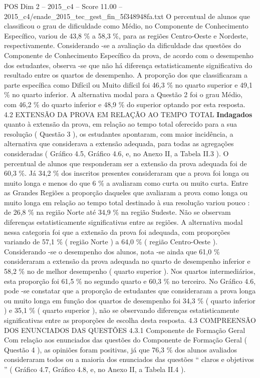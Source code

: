 \begin{textsample}{POS Dim 2 – 2015\_c4 – Score 11.00 – 2015\_c4/enade\_2015\_tec\_gest\_fin\_5f348948fa.txt}
O percentual de alunos que classificou o grau de dificuldade como Médio, no Componente de Conhecimento Específico, variou de 43,8 \% a 58,3 \%, para as regiões Centro-Oeste e Nordeste, respectivamente.
Considerando -se a avaliação da dificuldade das questões do Componente de Conhecimento Específico da prova, de acordo com o desempenho dos estudantes, observa -se que não há diferença estatisticamente significativa do resultado entre os quartos de desempenho.
A proporção dos que classificaram a parte específica como Difícil ou Muito difícil foi 46,3 \% no quarto superior e 49,1 \% no quarto inferior.
A alternativa modal para a Questão 2 foi o grau Médio, com 46,2 \% do quarto inferior e 48,9 \% do superior optando por esta resposta. 4.2 EXTENSÃO DA PROVA EM RELAÇÃO AO TEMPO TOTAL \textbf{Indagados} quanto à extensão da prova, em relação ao tempo total oferecido para a sua resolução ( Questão 3 ), os estudantes apontaram, com maior incidência, a alternativa que considerava a extensão adequada, para todas as agregações consideradas ( Gráfico 4.5, Gráfico 4.6, e, no Anexo II, a Tabela II.3 ).
O percentual de alunos que responderam ser a extensão da prova adequada foi de 60,3 \%.
Já 34,2 \% dos inscritos presentes consideraram que a prova foi longa ou muito longa e menos do que 6 \% a avaliaram como curta ou muito curta.
Entre as Grandes Regiões a proporção daqueles que avaliaram a prova como longa ou muito longa em relação ao tempo total destinado à sua resolução variou pouco : de 26,8 \% na região Norte até 34,9 \% na região Sudeste.
Não se observam diferenças estatisticamente significativas entre as regiões.
A alternativa modal nessa categoria foi que a extensão da prova foi adequada, com proporções variando de 57,1 \% ( região Norte ) a 64,0 \% ( região Centro-Oeste ).
Considerando -se o desempenho dos alunos, nota -se ainda que 61,0 \% consideraram a extensão da prova adequada no quarto de desempenho inferior e 58,2 \% no de melhor desempenho ( quarto superior ).
Nos quartos intermediários, esta proporção foi 61,5 \% no segundo quarto e 60,3 \% no terceiro.
No Gráfico 4.6, pode -se constatar que a proporção de estudantes que consideraram a prova longa ou muito longa em função dos quartos de desempenho foi 34,3 \% ( quarto inferior ) e 35,1 \% ( quarto superior ), não se observando diferenças estatisticamente significativas entre as proporções de escolha desta resposta. 4.3 COMPREENSÃO DOS ENUNCIADOS DAS QUESTÕES 4.3.1 Componente de Formação Geral Com relação aos enunciados das questões do Componente de Formação Geral ( Questão 4 ), as opiniões foram positivas, já que 76,3 \% dos alunos avaliados consideraram todos ou a maioria dos enunciados das questões “ claros e objetivos ” ( Gráfico 4.7, Gráfico 4.8, e, no Anexo II, a Tabela II.4 ).

\end{textsample}
